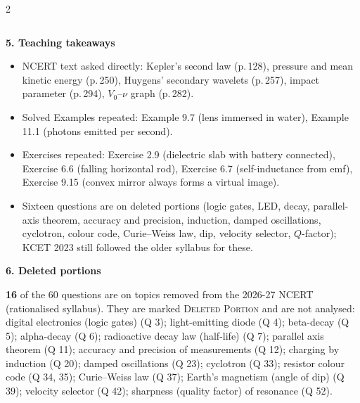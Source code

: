 \begin{multicols}{2}
{\begin{tabular}{@{}p{4.7cm}c@{\,}r@{\,}r@{\,}r@{}}
\bottomrule\end{tabular}}\par\medskip
\textbf{\color{crimson}5. Teaching takeaways}\par\smallskip
{\footnotesize\begin{itemize}[leftmargin=1em,nosep]
\item NCERT text asked directly: Kepler's second law (p.\,128), pressure and mean kinetic energy (p.\,250), Huygens' secondary wavelets (p.\,257), impact parameter (p.\,294), $V_0$--$\nu$ graph (p.\,282).
\item Solved Examples repeated: Example 9.7 (lens immersed in water), Example 11.1 (photons emitted per second).
\item Exercises repeated: Exercise 2.9 (dielectric slab with battery connected), Exercise 6.6 (falling horizontal rod), Exercise 6.7 (self-inductance from emf), Exercise 9.15 (convex mirror always forms a virtual image).
\item Sixteen questions are on deleted portions (logic gates, LED, decay, parallel-axis theorem, accuracy and precision, induction, damped oscillations, cyclotron, colour code, Curie--Weiss law, dip, velocity selector, $Q$-factor); KCET 2023 still followed the older syllabus for these.
\end{itemize}}\par\medskip
\textbf{\color{crimson}6. Deleted portions}\par\smallskip
\textbf{16} of the 60 questions are on topics removed from the 2026-27 NCERT (rationalised syllabus). They are marked \textsc{Deleted Portion} and are not analysed: digital electronics (logic gates) (Q 3); light-emitting diode (Q 4); beta-decay (Q 5); alpha-decay (Q 6); radioactive decay law (half-life) (Q 7); parallel axis theorem (Q 11); accuracy and precision of measurements (Q 12); charging by induction (Q 20); damped oscillations (Q 23); cyclotron (Q 33); resistor colour code (Q 34, 35); Curie--Weiss law (Q 37); Earth's magnetism (angle of dip) (Q 39); velocity selector (Q 42); sharpness (quality factor) of resonance (Q 52).\par
\end{multicols}









